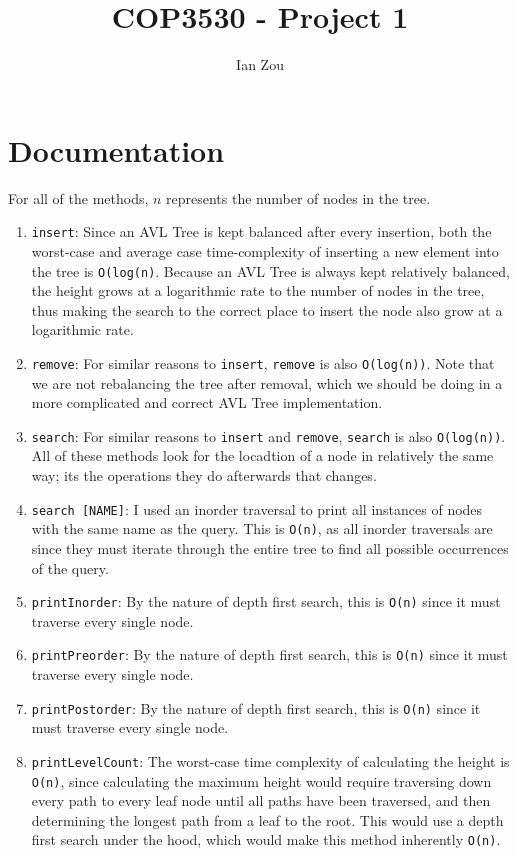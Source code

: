 \documentclass[12pt, letterpaper]{article}
\title{COP3530 - Project 1}
\author{Ian Zou}
\begin{document}
\maketitle

\section*{Documentation}

For all of the methods, $ n $ represents the number of nodes in the tree.

\begin{enumerate}
    \item \texttt{insert}: Since an AVL Tree is kept balanced after every insertion, both the worst-case and average case time-complexity of inserting a new element into the tree is \texttt{O(log(n)}. Because an AVL Tree is always kept relatively balanced, the height grows at a logarithmic rate to the number of nodes in the tree, thus making the search to the correct place to insert the node also grow at a logarithmic rate.
    \item \texttt{remove}: For similar reasons to \texttt{insert}, \texttt{remove} is also \texttt{O(log(n))}. Note that we are not rebalancing the tree after removal, which we should be doing in a more complicated and correct AVL Tree implementation.
    \item \texttt{search}: For similar reasons to \texttt{insert} and \texttt{remove}, \texttt{search} is also \texttt{O(log(n))}. All of these methods look for the locadtion of a node in relatively the same way; its the operations they do afterwards that changes.
    \item \texttt{search [NAME]}: I used an inorder traversal to print all instances of nodes with the same name as the query. This is \texttt{O(n)}, as all inorder traversals are since they must iterate through the entire tree to find all possible occurrences of the query.
    \item \texttt{printInorder}: By the nature of depth first search, this is \texttt{O(n)} since it must traverse every single node.
    \item \texttt{printPreorder}: By the nature of depth first search, this is \texttt{O(n)} since it must traverse every single node.
    \item \texttt{printPostorder}: By the nature of depth first search, this is \texttt{O(n)} since it must traverse every single node.
    \item \texttt{printLevelCount}: The worst-case time complexity of calculating the height is \texttt{O(n)}, since calculating the maximum height would require traversing down every path to every leaf node until all paths have been traversed, and then determining the longest path from a leaf to the root. This would use a depth first search under the hood, which would make this method inherently \texttt{O(n)}.

\end{enumerate}
\end{document}
